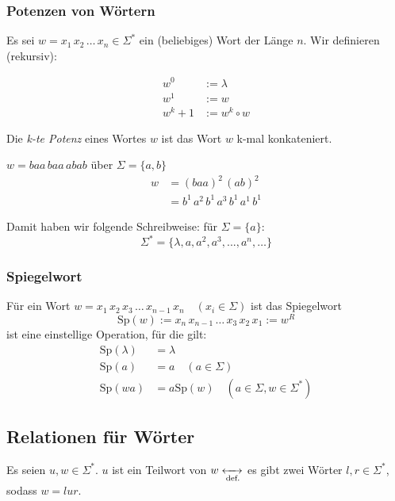 \documentclass[runningheads,deutsch]{llncs}
\begin{document}
\subsubsection{Potenzen von Wörtern}
Es sei $w = x_1\, x_2 \, \dots \, x_n \in \Sigma^*$ ein (beliebiges) Wort der Länge $n$. Wir definieren (rekursiv):

\begin{align}
    w^0 &:= \lambda \\
    w^1 &:= w \\
    w^k+1 &:= w^k \circ w
\end{align}

Die \textit{k-te Potenz} eines Wortes $w$ ist das Wort $w$ k-mal konkateniert.

\begin{example}
    $w = baa\, baa\, abab$ über $\Sigma = \{a, b\}$
    \begin{align*}
        w &= (baa)^2 \, (ab)^2 \\
        &= b^1\, a^2 \, b^1\, a^3\, b^1\, a^1\, b^1
    \end{align*}
\end{example}

Damit haben wir folgende Schreibweise: für $\Sigma = \{a\}$:
\[ \Sigma^* = \{\lambda, a, a^2, a^3, ..., a^n, \dots \} \]

\subsubsection{Spiegelwort}

Für ein Wort $w = x_1\, x_2\, x_3\, \dots \, x_{n-1}\, x_n \quad (x_i \in \Sigma)$ ist das Spiegelwort
\[ \text{Sp}(w) := x_n\, x_{n-1}\, \dots \, x_3\, x_2\, x_1 := w^R \]
 ist eine einstellige Operation, für die gilt:
\begin{align}
    \text{Sp}(\lambda) &= \lambda \\
    \text{Sp}(a) &= a \quad (a \in \Sigma) \\
    \text{Sp}(wa) &= a \text{Sp}(w) \quad (a \in \Sigma, w \in \Sigma^*)
\end{align}

\subsection{Relationen für Wörter}

\begin{definition}
    Es seien $u, w \in \Sigma^*$. $u$ ist ein Teilwort von $w \xleftrightarrow[\text{def.}]{}$ es gibt zwei Wörter $l, r \in \Sigma^*$, sodass $w=lur$.
\end{definition}
\end{document}
